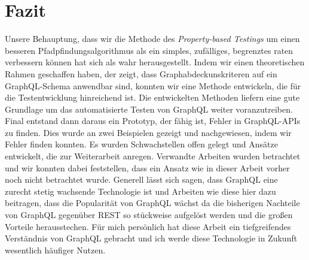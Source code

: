 \chapter{Fazit}
\label{fazit}

Unsere Behauptung, dass wir die Methode des \textit{Property-based Testings} um einen besseren Pfadpfindungsalgorithmus
als ein simples, zufälliges, begrenztes raten verbessern können hat sich als wahr herausgestellt.
Indem wir einen theoretischen Rahmen geschaffen haben, der zeigt, dass Graphabdeckunskriteren auf ein GraphQL-Schema anwendbar sind,
konnten wir eine Methode entwickeln, die für die Testentwicklung hinreichend ist.
Die entwickelten Methoden liefern eine gute Grundlage um das automatisierte Testen von GraphQL weiter voranzutreiben.
Final entstand dann daraus ein Prototyp, der fähig ist, Fehler in GraphQL-APIs zu finden.
Dies wurde an zwei Beispielen gezeigt und nachgewiesen, indem wir Fehler finden konnten.
Es wurden Schwachstellen offen gelegt und Ansätze entwickelt, die zur Weiterarbeit anregen.
Verwandte Arbeiten wurden betrachtet und wir konnten dabei feststellen, dass ein Ansatz wie in dieser Arbeit vorher noch nicht betrachtet wurde.
Generell lässt sich sagen, dass GraphQL eine zurecht stetig wachsende Technologie ist und Arbeiten wie diese hier
dazu beitragen, dass die Popularität von GraphQL wächst da die bisherigen Nachteile von GraphQL gegenüber REST so stückweise aufgelöst werden
und die großen Vorteile herausstechen.
Für mich persönlich hat diese Arbeit ein tiefgreifendes Verständnis von GraphQL gebracht und ich werde diese Technologie in Zukunft wesentlich
häufiger Nutzen.

